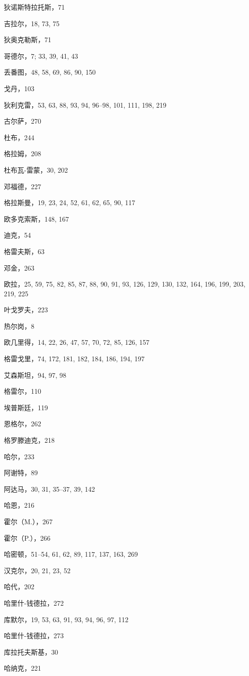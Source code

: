 狄诺斯特拉托斯，71

吉拉尔，18, 73, 75

狄奥克勒斯，71

哥德尔，7; 33, 39, 41, 43

丢番图，48, 58, 69, 86, 90, 150

戈丹，103

狄利克雷，53, 63, 88, 93, 94, 96--98, 101, 111, 198, 219

古尔萨，270

杜布，244

格拉姆，208

杜布瓦-雷蒙，30, 202

邓福德，227

格拉斯曼，19, 23, 24, 52, 61, 62, 65, 90, 117

欧多克索斯，148, 167

迪克，54

格雷夫斯，63

邓金，263

欧拉，25, 59, 75, 82, 85, 87, 88, 90, 91, 93, 126, 129, 130, 132, 164, 196, 199, 203, 219, 225

叶戈罗夫，223

热尔岗，8

欧几里得，14, 22, 26, 47, 57, 70, 72, 85, 126, 157

格雷戈里，74, 172, 181, 182, 184, 186, 194, 197

艾森斯坦，94, 97, 98

格雷尔，110

埃普斯廷，119

恩格尔，262

格罗滕迪克，218

哈尔，233

阿谢特，89

阿达马，30, 31, 35--37, 39, 142

哈恩，216

霍尔（M.），267

霍尔（P.），266

哈密顿，51--54, 61, 62, 89, 117, 137, 163, 269

汉克尔，20, 21, 23, 52

哈代，202

哈里什-钱德拉，272

库默尔，19, 53, 63, 91, 93, 94, 96, 97, 112

哈里什-钱德拉，273

库拉托夫斯基，30

哈纳克，221

